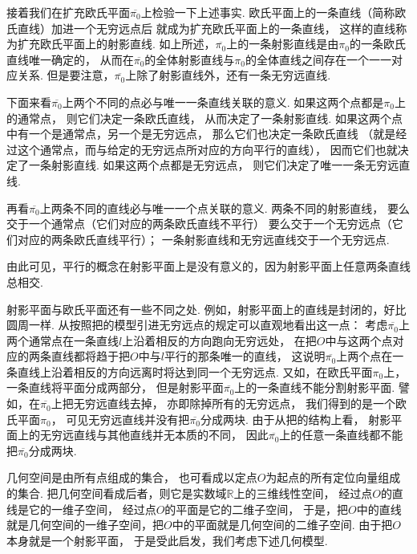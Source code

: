 接着我们在扩充欧氏平面\(\overline{\pi_0}\)上检验一下上述事实.
欧氏平面上的一条直线（简称欧氏直线）加进一个无穷远点后
就成为扩充欧氏平面上的一条直线，
这样的直线称为扩充欧氏平面上的射影直线.
如上所述，\(\overline{\pi_0}\)上的一条射影直线是由\(\pi_0\)的一条欧氏直线唯一确定的，
从而在\(\overline{\pi_0}\)的全体射影直线与\(\pi_0\)的全体直线之间存在一个一一对应关系.
但是要注意，\(\overline{\pi_0}\)上除了射影直线外，还有一条无穷远直线.

下面来看\(\overline{\pi_0}\)上两个不同的点必与唯一一条直线关联的意义.
如果这两个点都是\(\pi_0\)上的通常点，
则它们决定一条欧氏直线，
从而决定了一条射影直线.
如果这两个点中有一个是通常点，另一个是无穷远点，
那么它们也决定一条欧氏直线
（就是经过这个通常点，而与给定的无穷远点所对应的方向平行的直线），
因而它们也就决定了一条射影直线.
如果这两个点都是无穷远点，
则它们决定了唯一一条无穷远直线.

再看\(\overline{\pi_0}\)上两条不同的直线必与唯一一个点关联的意义.
两条不同的射影直线，
要么交于一个通常点（它们对应的两条欧氏直线不平行）
要么交于一个无穷远点（它们对应的两条欧氏直线平行）；
一条射影直线和无穷远直线交于一个无穷远点.

由此可见，平行的概念在射影平面上是没有意义的，因为射影平面上任意两条直线总相交.

射影平面与欧氏平面还有一些不同之处.
例如，射影平面上的直线是封闭的，好比圆周一样.
从按照把的模型引进无穷远点的规定可以直观地看出这一点：
考虑\(\overline{\pi_0}\)上两个通常点在一条直线\(l\)上沿着相反的方向跑向无穷远处，
在把\(O\)中与这两个点对应的两条直线都将趋于把\(O\)中与\(l\)平行的那条唯一的直线，
这说明\(\overline{\pi_0}\)上两个点在一条直线上沿着相反的方向远离时将达到同一个无穷远点.
又如，在欧氏平面\(\pi_0\)上，一条直线将平面分成两部分，
但是射影平面\(\overline{\pi_0}\)上的一条直线不能分割射影平面.
譬如，在\(\overline{\pi_0}\)上把无穷远直线去掉，
亦即除掉所有的无穷远点，
我们得到的是一个欧氏平面\(\pi_0\)，
可见无穷远直线并没有把\(\overline{\pi_0}\)分成两块.
由于从把的结构上看，
射影平面上的无穷远直线与其他直线并无本质的不同，
因此\(\overline{\pi_0}\)上的任意一条直线都不能把\(\overline{\pi_0}\)分成两块.

几何空间是由所有点组成的集合，
也可看成以定点\(O\)为起点的所有定位向量组成的集合.
把几何空间看成后者，则它是实数域\(\mathbb{R}\)上的三维线性空间，
经过点\(O\)的直线是它的一维子空间，
经过点\(O\)的平面是它的二维子空间，
于是，把\(O\)中的直线就是几何空间的一维子空间，把\(O\)中的平面就是几何空间的二维子空间.
由于把\(O\)本身就是一个射影平面，
于是受此启发，我们考虑下述几何模型.

